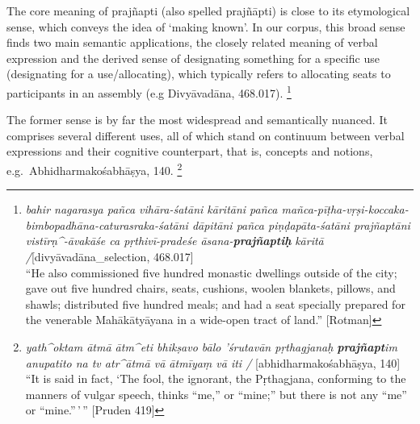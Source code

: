 \documentclass[
  letterpaper,
  DIV=11,
  numbers=noendperiod,
  oneside]{scrreprt}
\begin{document}
{}

The core meaning of prajñapti (also spelled prajñāpti) is close to its
etymological sense, which conveys the idea of `making known'. In our
corpus, this broad sense finds two main semantic applications, the
closely related meaning of verbal expression and the derived sense of
designating something for a specific use (designating for a
use/allocating), which typically refers to allocating seats to
participants in an assembly (e.g Divyāvadāna, 468.017). \footnote{\emph{bahir
  nagarasya pañca vihāra-śatāni kāritāni pañca
  mañca-pīṭha-vṛṣi-koccaka-bimbopadhāna-caturasraka-śatāni dāpitāni
  pañca piṇḍapāta-śatāni prajñaptāni vistīrṇ\^{}-āvakāśe ca
  pṛthivī-pradeśe āsana-\textbf{prajñaptiḥ}} \emph{kāritā
  /}{[}divyāvadāna\_selection, 468.017{]}\\
  ``He also commissioned five hundred monastic dwellings outside of the
  city; gave out five hundred chairs, seats, cushions, woolen blankets,
  pillows, and shawls; distributed five hundred meals; and had a seat
  specially prepared for the venerable Mahākātyāyana in a wide-open
  tract of land.'' {[}Rotman{]}}

The former sense is by far the most widespread and semantically nuanced.
It comprises several different uses, all of which stand on continuum
between verbal expressions and their cognitive counterpart, that is,
concepts and notions, e.g.~Abhidharmakośabhāṣya, 140. \footnote{\emph{yath\^{}oktam
  ātmā ātm\^{}eti bhikṣavo bālo 'śrutavān pṛthagjanaḥ
  \textbf{prajñapt}im anupatito na tv atr\^{}ātmā vā ātmīyaṃ vā iti /}
  {[}abhidharmakośabhāṣya, 140{]}\\
  ``It is said in fact, `The fool, the ignorant, the Pṛthagjana,
  conforming to the manners of vulgar speech, thinks ``me,'' or
  ``mine;'' but there is not any ``me'' or ``mine.''\,'\,'' {[}Pruden
  419{]}}
\end{document}
